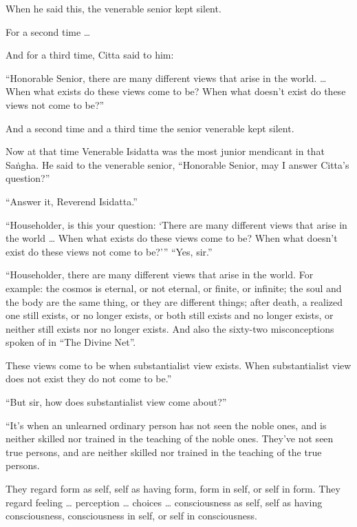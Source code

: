 \documentclass[12pt,openany]{book}%
\begin{document}
When he said this, the venerable senior kept silent. 

For a second time … 

And for a third time, Citta said to him: 

“Honorable Senior, there are many different views that arise in the world. … When what exists do these views come to be? When what doesn’t exist do these views not come to be?” 

And a second time and a third time the senior venerable kept silent. 

Now at that time Venerable Isidatta was the most junior mendicant in that \textsanskrit{Saṅgha}. He said to the venerable senior, “Honorable Senior, may I answer Citta’s question?” 

“Answer it, Reverend Isidatta.” 

“Householder, is this your question: ‘There are many different views that arise in the world … When what exists do these views come to be? When what doesn’t exist do these views not come to be?’” “Yes, sir.” 

“Householder, there are many different views that arise in the world. For example: the cosmos is eternal, or not eternal, or finite, or infinite; the soul and the body are the same thing, or they are different things; after death, a realized one still exists, or no longer exists, or both still exists and no longer exists, or neither still exists nor no longer exists. And also the sixty-two misconceptions spoken of in “The Divine Net”. 

These views come to be when substantialist view exists. When substantialist view does not exist they do not come to be.” 

“But sir, how does substantialist view come about?” 

“It’s when an unlearned ordinary person has not seen the noble ones, and is neither skilled nor trained in the teaching of the noble ones. They’ve not seen true persons, and are neither skilled nor trained in the teaching of the true persons. 

They regard form as self, self as having form, form in self, or self in form. They regard feeling … perception … choices … consciousness as self, self as having consciousness, consciousness in self, or self in consciousness. 
\end{document}
